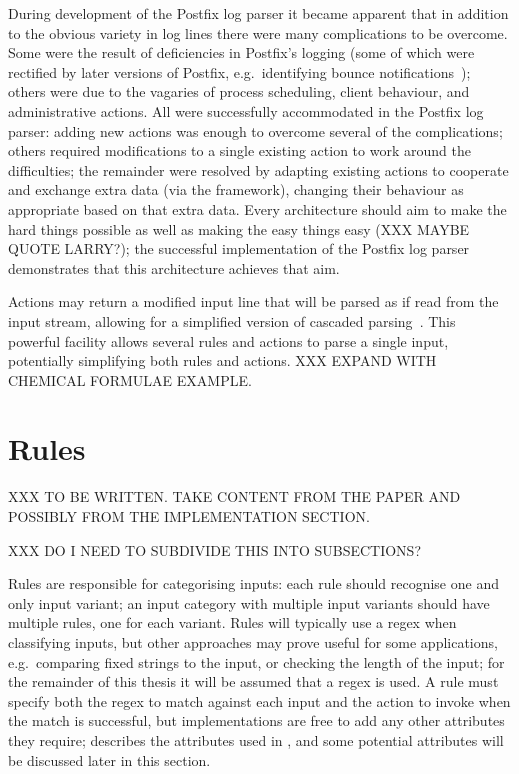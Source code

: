 During development of the Postfix log parser it became apparent that in
addition to the obvious variety in log lines there were
many complications to be overcome.  Some were the result of deficiencies in
Postfix's logging (some of which were rectified by later versions of
Postfix, e.g.\ identifying bounce
notifications~); others were
due to the vagaries of process scheduling, client behaviour, and
administrative actions.  All were successfully accommodated in the Postfix
log parser: adding new actions was enough to overcome several of the
complications; others required modifications to a single existing action to
work around the difficulties; the remainder were resolved by adapting
existing actions to cooperate and exchange extra data (via the framework),
changing their behaviour as appropriate based on that extra data.  Every
architecture should aim to make the hard things possible as well as making
the easy things easy (XXX MAYBE QUOTE LARRY\@?); the successful
implementation of the Postfix log parser demonstrates that this
architecture achieves that aim.

Actions may return a modified input line that will be parsed as if read
from the input stream, allowing for a simplified version of cascaded
parsing~\cite{cascaded-parsing}.  This powerful facility allows several
rules and actions to parse a single input, potentially simplifying both
rules and actions.  XXX EXPAND WITH CHEMICAL FORMULAE EXAMPLE\@.


\section{Rules}

\label{rules in architecture}

XXX TO BE WRITTEN\@.  TAKE CONTENT FROM THE PAPER AND POSSIBLY FROM THE
IMPLEMENTATION SECTION\@.

XXX DO I NEED TO SUBDIVIDE THIS INTO SUBSECTIONS\@?

Rules are responsible for categorising inputs: each rule should recognise
one and only input variant; an input category with multiple input variants
should have multiple rules, one for each variant.  Rules will typically use
a regex when classifying inputs, but other approaches may prove useful for
some applications, e.g.\ comparing fixed strings to the input, or checking
the length of the input; for the remainder of this thesis it will be
assumed that a regex is used.  A rule must specify both the regex to match
against each input and the action to invoke when the match is successful,
but implementations are free to add any other attributes they require;
 describes the attributes used in
\parsername{}, and some potential attributes will be discussed later in
this section.

